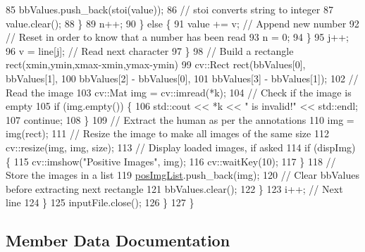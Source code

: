 \begin{DoxyCode}
85                             bbValues.push\_back(stoi(value));
86                             \textcolor{comment}{// stoi converts string to integer}
87                             value.clear();
88                         \}
89                         n++;
90                     \} \textcolor{keywordflow}{else} \{
91                         value += v;  \textcolor{comment}{// Append new number}
92                         \textcolor{comment}{// Reset in order to know that a number has been read}
93                         n = 0;
94                     \}
95                     j++;
96                     v = line[j];  \textcolor{comment}{// Read next character}
97                 \}
98                 \textcolor{comment}{// Build a rectangle rect(xmin,ymin,xmax-xmin,ymax-ymin)}
99                 cv::Rect rect(bbValues[0], bbValues[1],
100                               bbValues[2] - bbValues[0],
101                               bbValues[3] - bbValues[1]);
102                 \textcolor{comment}{// Read the image}
103                 cv::Mat img = cv::imread(*k);
104                 \textcolor{comment}{// Check if the image is empty}
105                 \textcolor{keywordflow}{if} (img.empty()) \{
106                     std::cout << *k << \textcolor{stringliteral}{" is invalid!"} << std::endl;
107                     \textcolor{keywordflow}{continue};
108                 \}
109                 \textcolor{comment}{// Extract the human as per the annotations}
110                 img = img(rect);
111                 \textcolor{comment}{// Resize the image to make all images of the same size}
112                 cv::resize(img, img, size);
113                 \textcolor{comment}{// Display loaded images, if asked}
114                 \textcolor{keywordflow}{if} (dispImg) \{
115                     cv::imshow(\textcolor{stringliteral}{"Positive Images"}, img);
116                     cv::waitKey(10);
117                 \}
118                 \textcolor{comment}{// Store the images in a list}
119                 \hyperlink{classData_a42bd07ac68b6b13b10b1e1b53a9c682c}{posImgList}.push\_back(img);
120                 \textcolor{comment}{// Clear bbValues before extracting next rectangle}
121                 bbValues.clear();
122            \}
123            i++;  \textcolor{comment}{// Next line}
124         \}
125         inputFile.close();
126     \}
127 \}
\end{DoxyCode}


\subsection{Member Data Documentation}
